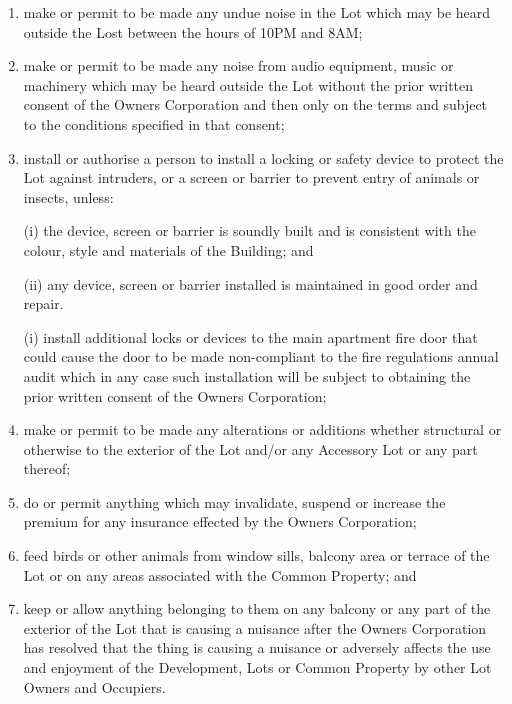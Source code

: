 \documentclass{article}
\begin{document}
\begin{enumerate}[label=\arabic*.]
\begin{enumerate}[label=\arabic{enumi}.\arabic*.]
\begin{enumerate}[label=\arabic{enumi}.\arabic*.]
\begin{enumerate}[label=(\arabic*)]
\begin{enumerate}[label=(\alph*)]
\item  make or permit to be made any undue noise in the Lot which may be heard outside the Lost between the hours of 10PM and 8AM;

\item  make or permit to be made any noise from audio equipment, music or machinery which may be heard outside the Lot without the prior written consent of the Owners Corporation and then only on the terms and subject to the conditions specified in that consent;

\item  install or authorise a person to install a locking or safety device to protect the Lot against intruders, or a screen or barrier to prevent entry of animals or insects, unless:

(i) the device, screen or barrier is soundly built and is consistent with the colour, style and materials of the Building; and

(ii) any device, screen or barrier installed is maintained in good order and repair.

(i) install additional locks or devices to the main apartment fire door that could cause the door to be made non-compliant to the fire regulations annual audit which in any case such installation will be subject to obtaining the prior written consent of the Owners Corporation;

\item  make or permit to be made any alterations or additions whether structural or otherwise to the exterior of the Lot and/or any Accessory Lot or any part thereof;

\item  do or permit anything which may invalidate, suspend or increase the premium for any insurance effected by the Owners Corporation;
\newpage



\item  feed birds or other animals from window sills, balcony area or terrace of the Lot or on any areas associated with the Common Property; and

\item  keep or allow anything belonging to them on any balcony or any part of the exterior of the Lot that is causing a nuisance after the Owners Corporation has resolved that the thing is causing a nuisance or adversely affects the use and enjoyment of the Development, Lots or Common Property by other Lot Owners and Occupiers.

\end{enumerate}


\end{enumerate}
\end{enumerate}
\end{enumerate}
\end{enumerate}
\end{document}
